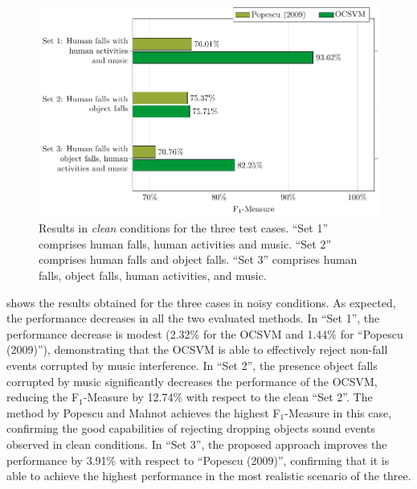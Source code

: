 \begin{figure}[t]
	\centering
	\includegraphics[width=\columnwidth]{img/cin_only_ocsv/res_clean.pdf}
	\caption{Results in \textit{clean} conditions for the three test cases. ``Set 1'' comprises human falls, human activities and music. ``Set 2'' comprises human falls and object falls. ``Set 3'' comprises human falls, object falls, human activities, and music.} \label{fig:res_clean}
\end{figure}

 shows the results obtained for the three cases in noisy conditions. As expected, the performance decreases in all the two evaluated methods. In ``Set 1'', the performance decrease is modest (2.32\% for the OCSVM and 1.44\% for ``Popescu (2009)''), demonstrating that the OCSVM is able to effectively reject non-fall events corrupted by music interference. In ``Set 2'', the presence object falls corrupted by music significantly decreases the performance of the OCSVM, reducing the F$_1$-Measure by 12.74\% with respect to the clean ``Set 2''. The method by Popescu and Mahnot \cite{Popescu2009} achieves the highest F$_1$-Measure in this case, confirming the good capabilities of rejecting dropping objects sound events observed in clean conditions. In ``Set 3'', the proposed approach improves the performance by 3.91\% with respect to ``Popescu (2009)'', confirming that it is able to achieve the highest performance in the most realistic scenario of the three.


